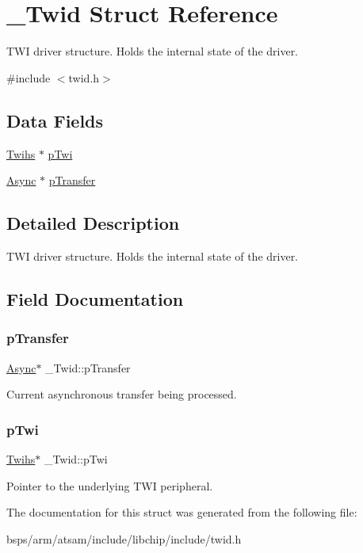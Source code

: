 \hypertarget{struct__Twid}{}\section{\+\_\+\+Twid Struct Reference}
\label{struct__Twid}


T\+WI driver structure. Holds the internal state of the driver.  




{\ttfamily \#include $<$twid.\+h$>$}

\subsection*{Data Fields}
\begin{DoxyCompactItemize}
\item 
\mbox{\hyperlink{structTwihs}{Twihs}} $\ast$ \mbox{\hyperlink{struct__Twid_af91315c42e9a380a8a918e15b6c8d232}{p\+Twi}}
\item 
\mbox{\hyperlink{struct__Async}{Async}} $\ast$ \mbox{\hyperlink{struct__Twid_a6e96c1a9f07ae0cf2fd5dadcb4fdbee1}{p\+Transfer}}
\end{DoxyCompactItemize}


\subsection{Detailed Description}
T\+WI driver structure. Holds the internal state of the driver. 

\subsection{Field Documentation}
\mbox{\label{struct__Twid_a6e96c1a9f07ae0cf2fd5dadcb4fdbee1}} 
\subsubsection{\texorpdfstring{pTransfer}{pTransfer}}
{\footnotesize\ttfamily \mbox{\hyperlink{struct__Async}{Async}}$\ast$ \+\_\+\+Twid\+::p\+Transfer}

Current asynchronous transfer being processed. \mbox{\label{struct__Twid_af91315c42e9a380a8a918e15b6c8d232}} 
\subsubsection{\texorpdfstring{pTwi}{pTwi}}
{\footnotesize\ttfamily \mbox{\hyperlink{structTwihs}{Twihs}}$\ast$ \+\_\+\+Twid\+::p\+Twi}

Pointer to the underlying T\+WI peripheral. 

The documentation for this struct was generated from the following file\+:\begin{DoxyCompactItemize}
\item 
bsps/arm/atsam/include/libchip/include/twid.\+h\end{DoxyCompactItemize}
